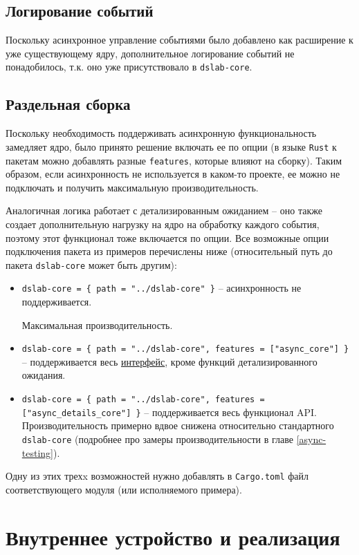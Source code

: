 \subsection{Логирование событий}

Поскольку асинхронное управление событиями было добавлено как расширение к уже существующему ядру, дополнительное логирование событий не понадобилось, т.к. оно уже присутствовало в \texttt{dslab-core}.

\subsection{Раздельная сборка}

Поскольку необходимость поддерживать асинхронную функциональность замедляет ядро, было принято решение включать ее по опции (в языке \texttt{Rust} к пакетам можно добавлять разные \texttt{features}, которые влияют на сборку). Таким образом, если асинхронность не используется в каком-то проекте, ее можно не подключать и получить максимальную производительность. 

Аналогичная логика работает с детализированным ожиданием -- оно также создает дополнительную нагрузку на ядро на обработку каждого события, поэтому этот функционал тоже включается по опции. Все возможные опции подключения пакета из примеров перечислены ниже (относительный путь до пакета \texttt{dslab-core} может быть другим): 
\begin{itemize}
    \item \small \texttt{dslab-core = \{ path = "../dslab-core" \}} -- асинхронность не поддерживается. 
    
    Максимальная производительность. 
    \item \small \texttt{dslab-core = \{ path = "../dslab-core", features = ["async\_core"] \} } -- поддерживается весь \hyperref[interface]{интерфейс}, кроме функций детализированного ожидания. 
    \item \small \texttt{dslab-core = \{ path = "../dslab-core",   features = ["async\_details\_core"] \}} -- поддерживается весь функционал API. Производительность примерно вдвое снижена относительно стандартного \texttt{dslab-core} (подробнее про замеры производительности в главе \ref{async-testing}).
\end{itemize}
Одну из этих трехx возможностей нужно добавлять в \texttt{Cargo.toml} файл соответствующего модуля (или исполняемого примера).


\newpage 
\section{Внутреннее устройство и реализация}\label{inner}

